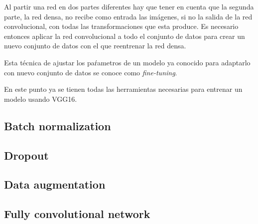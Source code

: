Al partir una red en dos partes diferentes hay que tener en cuenta que la segunda parte, la red densa, no recibe como entrada las imágenes, si no la salida de la red convolucional, con todas las transformaciones que esta produce. Es necesario entonces aplicar la red convolucional a todo el conjunto de datos para crear un nuevo conjunto de datos con el que reentrenar la red densa.

Esta técnica de ajustar los paŕametros de un modelo ya conocido para adaptarlo con nuevo conjunto de datos se conoce como \textit{fine-tuning}.

En este punto ya se tienen todas las herramientas necesarias para entrenar un modelo usando VGG16.
\subsection{Batch normalization}
\subsection{Dropout}
\subsection{Data augmentation}
\subsection{Fully convolutional network}

